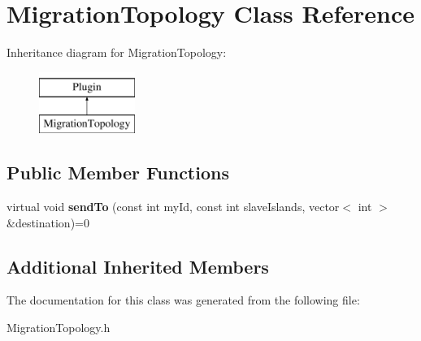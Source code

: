 \hypertarget{classMigrationTopology}{}\section{Migration\+Topology Class Reference}
\label{classMigrationTopology}
Inheritance diagram for Migration\+Topology\+:\begin{figure}[H]
\begin{center}
\leavevmode
\includegraphics[height=2.000000cm]{d8/d7a/classMigrationTopology}
\end{center}
\end{figure}
\subsection*{Public Member Functions}
\begin{DoxyCompactItemize}
\item 
\mbox{\label{classMigrationTopology_a42c2391ef6355880a308ef98beb7273b}} 
virtual void {\bfseries send\+To} (const int my\+Id, const int slave\+Islands, vector$<$ int $>$ \&destination)=0
\end{DoxyCompactItemize}
\subsection*{Additional Inherited Members}


The documentation for this class was generated from the following file\+:\begin{DoxyCompactItemize}
\item 
Migration\+Topology.\+h\end{DoxyCompactItemize}
